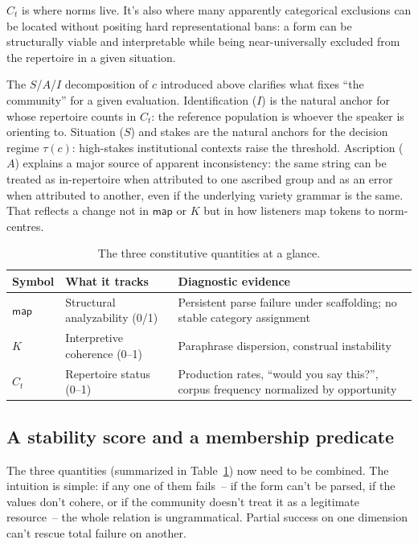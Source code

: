 \documentclass[12pt,letterpaper]{article}
\begin{document}
$C_t$ is where norms live. It's also where many apparently categorical exclusions can be located without positing hard representational bans: a form can be structurally viable and interpretable while being near-universally excluded from the repertoire in a given situation.

The $S$/$A$/$I$ decomposition of $c$ introduced above clarifies what fixes \enquote{the community} for a given evaluation. Identification ($I$) is the natural anchor for whose repertoire counts in $C_t$: the reference population is whoever the speaker is orienting to. Situation ($S$) and stakes are the natural anchors for the decision regime $\tau(c)$: high-stakes institutional contexts raise the threshold. Ascription ($A$) explains a major source of apparent inconsistency: the same string can be treated as in-repertoire when attributed to one ascribed group and as an error when attributed to another, even if the underlying variety grammar is the same. That reflects a change not in $\mathsf{map}$ or $K$ but in how listeners map tokens to norm-centres.

\begin{table}[H]
\centering
\footnotesize
\begin{tabular}{@{}lp{4.5cm}p{5.5cm}@{}}
\toprule
\textbf{Symbol} & \textbf{What it tracks} & \textbf{Diagnostic evidence} \\
\midrule
$\mathsf{map}$ & Structural analyzability (0/1) & Persistent parse failure under scaffolding; no stable category assignment \\
$K$ & Interpretive coherence (0--1) & Paraphrase dispersion, construal instability \\
$C_t$ & Repertoire status (0--1) & Production rates, \enquote{would you say this?}, corpus frequency normalized by opportunity \\
\bottomrule
\end{tabular}
\caption{The three constitutive quantities at a glance.}
\label{tab:symbols}
\end{table}

\subsection{A stability score and a membership predicate}\label{sec:stability}

The three quantities (summarized in Table~\ref{tab:symbols}) now need to be combined. The intuition is simple: if any one of them fails~-- if the form can't be parsed, if the values don't cohere, or if the community doesn't treat it as a legitimate resource~-- the whole relation is ungrammatical. Partial success on one dimension can't rescue total failure on another.
\end{document}
